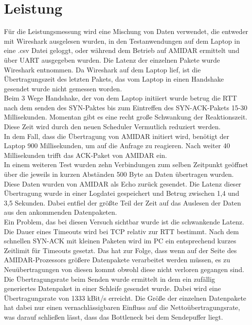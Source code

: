 \section{Leistung}
Für die Leistungsmessung wird eine Mischung von Daten verwendet, die entweder mit Wireshark ausgelesen wurden, in den Testanwendungen auf dem Laptop in eine .csv Datei geloggt, oder während dem Betrieb auf AMIDAR ermittelt und über UART ausgegeben wurden. 
Die Latenz der einzelnen Pakete wurde Wireshark entnommen. Da Wireshark auf dem Laptop lief, ist die Übertragungszeit des letzten Pakets, das vom Laptop in einen Handshake gesendet wurde nicht gemessen worden. \\
Beim 3 Wege Handshake, der von dem Laptop initiiert wurde betrug die RTT nach dem senden des SYN-Paktes bis zum Eintreffen des SYN-ACK-Pakets 15-30 Millisekunden. Momentan gibt es eine recht große Schwankung der Reaktionszeit. Diese Zeit wird durch den neuen Scheduler Vermutlich reduziert werden.\\
In dem Fall, dass die Übertragung von AMIDAR initiert wird, benötigt der Laptop 900 Millisekunden, um auf die Anfrage zu reagieren. Nach weiter 40 Millisekunden trifft das ACK-Paket von AMIDAR ein.\\
In einem weiteren Test wurden zehn Verbindungen zum selben Zeitpunkt geöffnet über die jeweils in kurzen Abständen 500 Byte an Daten übertragen wurden. Diese Daten wurden von AMIDAR als Echo zurück gesendet. Die Latenz dieser Übertragung wurde in einer Logdatei gespeichert und Betrug zwischen 1,4 und 3,5 Sekunden. Dabei entfiel der größte Teil der Zeit auf das Auslesen der Daten aus den ankommenden Datenpaketen.\\
Ein Problem, das bei diesen Versuch sichtbar wurde ist die schwankende Latenz. Die Dauer eines Timeouts wird bei TCP relativ zur RTT bestimmt. Nach dem schnellen SYN-ACK mit kleinen Paketen wird im PC ein entsprechend kurzes Zeitlimit für Timeouts gesetzt. Das hat zur Folge, dass wenn auf der Seite des AMIDAR-Prozessors größere Datenpakete verarbeitet werden müssen, es zu Neuübertragungen von diesen kommt obwohl diese nicht verloren gegangen sind.\\
Die Übertragungsrate beim Senden wurde ermittelt in dem ein zufällig generiertes Datenpaket in einer Schleife gesendet wurde. Dabei wird eine Übertragungsrate von 1333 kBit/s erreicht. Die Größe der einzelnen Datenpakete hat dabei nur einen vernachlässigbaren Einfluss auf die Nettoübertragungsrate, was darauf schließen lässt, dass das Bottleneck bei dem Sendepuffer liegt. 




 

 